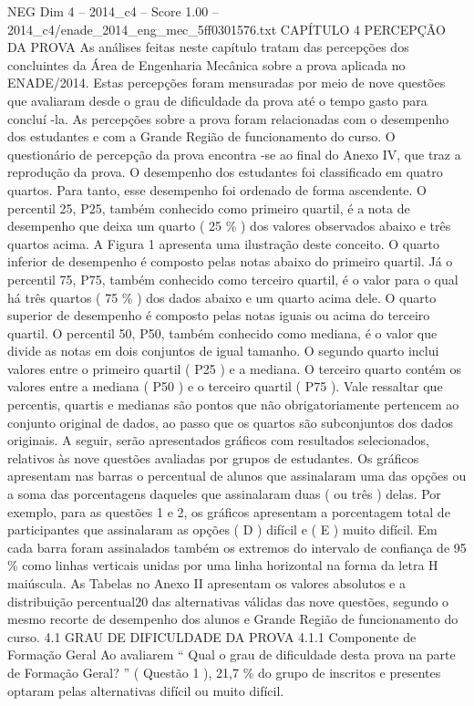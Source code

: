 \begin{textsample}{NEG Dim 4 – 2014\_c4 – Score 1.00 – 2014\_c4/enade\_2014\_eng\_mec\_5ff0301576.txt}  \label{ex:f4_neg_150}
CAPÍTULO 4 PERCEPÇÃO DA PROVA As análises feitas neste capítulo tratam das percepções dos concluintes da Área de Engenharia Mecânica sobre a prova aplicada no ENADE/2014.
Estas percepções foram mensuradas por meio de nove questões que avaliaram desde o grau de dificuldade da prova até o tempo gasto para concluí -la.
As percepções sobre a prova foram relacionadas com o desempenho dos estudantes e com a Grande Região de funcionamento do curso.
O questionário de percepção da prova encontra -se ao final do Anexo IV, que traz a reprodução da prova.
O desempenho dos estudantes foi classificado em quatro quartos.
Para tanto, esse desempenho foi ordenado de forma ascendente.
O percentil 25, P25, também conhecido como primeiro quartil, é a nota de desempenho que deixa um quarto ( 25 \% ) dos valores observados abaixo e três quartos acima.
A Figura 1 apresenta uma ilustração deste conceito.
O quarto inferior de desempenho é composto pelas notas abaixo do primeiro quartil.
Já o percentil 75, P75, também conhecido como terceiro quartil, é o valor para o qual há três quartos ( 75 \% ) dos dados abaixo e um quarto acima dele.
O quarto superior de desempenho é composto pelas notas iguais ou acima do terceiro quartil.
O percentil 50, P50, também conhecido como mediana, é o valor que divide as notas em dois conjuntos de igual tamanho.
O segundo quarto inclui valores entre o primeiro quartil ( P25 ) e a mediana.
O terceiro quarto contém os valores entre a mediana ( P50 ) e o terceiro quartil ( P75 ).
Vale ressaltar que percentis, quartis e medianas são pontos que não obrigatoriamente pertencem ao conjunto original de dados, ao passo que os quartos são subconjuntos dos dados originais.
A seguir, serão apresentados gráficos com resultados selecionados, relativos às nove questões avaliadas por grupos de estudantes.
Os gráficos apresentam nas barras o percentual de alunos que assinalaram uma das opções ou a soma das porcentagens daqueles que assinalaram duas ( ou três ) delas.
Por exemplo, para as questões 1 e 2, os gráficos apresentam a porcentagem total de participantes que assinalaram as opções ( D ) difícil e ( E ) muito difícil.
Em cada barra foram assinalados também os extremos do intervalo de confiança de 95 \% como linhas verticais unidas por uma linha horizontal na forma da letra H maiúscula.
As Tabelas no Anexo II apresentam os valores absolutos e a distribuição percentual20 das alternativas válidas das nove questões, segundo o mesmo recorte de desempenho dos alunos e Grande Região de funcionamento do curso. 4.1 GRAU DE DIFICULDADE DA PROVA 4.1.1 Componente de Formação Geral Ao avaliarem “ Qual o grau de dificuldade desta prova na parte de Formação Geral? ” ( Questão 1 ), 21,7 \% do grupo de inscritos e presentes optaram pelas alternativas difícil ou muito difícil.

\end{textsample}
